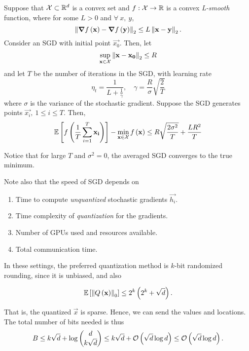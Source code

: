 \documentclass[twoside]{article}
\begin{document}
\begin{theorem}
    \label{thm:avg-sgd}
    Suppose that \(\mathcal X\subset\mathbb R^d\) is a convex set and \(f:\mathcal X\rightarrow\mathbb R\)
    is a convex \emph{L-smooth} function, where for some \(L > 0\) and
    \(\forall\ x,\ y\),
    \begin{equation}
        \left\lVert\boldsymbol{\mathbf{\nabla}}f\left(\boldsymbol{\mathbf{x}}\right)-\boldsymbol{\mathbf{\nabla}}f\left(\boldsymbol{\mathbf{y}}\right)\right\rVert_2 \le L\left\lVert\boldsymbol{\mathbf{x}}-\boldsymbol{\mathbf{y}}\right\rVert_2.
        \label{eq:L-smooth}
    \end{equation}
    Consider an SGD with initial point \(\vec{x_0}\). Then, let
    \begin{equation}
        \sup_{\boldsymbol{\mathbf{x}}\in\mathcal X}\left\lVert\boldsymbol{\mathbf{x}}-\boldsymbol{\mathbf{x_0}}\right\rVert_2 \le R
    \end{equation}
    and let \(T\) be the number of iterations in the SGD, with learning rate
    \begin{equation}
        \eta_t = \frac{1}{L + \frac{1}{\gamma}},\quad \gamma = \frac{R}{\sigma}\sqrt{\frac{2}{T}}
    \end{equation}
    where \(\sigma\) is the variance of the stochastic gradient. Suppose the 
    SGD generates points \(\vec{x_i},\ 1 \le i \le T\). Then,
    \begin{equation}
        \mathbb{E}\left[ f\left(\frac{1}{T}\sum_{i=1}^T\boldsymbol{\mathbf{x_i}}\right) \right] - \min_{\boldsymbol{\mathbf{x}}\in\mathcal X}f\left(\boldsymbol{\mathbf{x}}\right) \le R\sqrt{\frac{2\sigma^2}{T}} + \frac{LR^2}{T}
    \end{equation}
\end{theorem}

Notice that for large \(T\) and \(\sigma^2 = 0\), the averaged SGD converges 
to the true minimum.

Note also that the speed of SGD depends on

\begin{enumerate}
    \item Time to compute \emph{unquantized} stochastic gradients \(\vec{h_i}\).
    \item Time complexity of \emph{quantization} for the gradients.
    \item Number of GPUs used and resources available.
    \item Total communication time.
\end{enumerate}

In these settings, the preferred quantization method is \(k\)-bit randomized
rounding, since it is unbiased, and also

\begin{equation}
    \mathbb{E}\left[ \left\lVert Q\left(\boldsymbol{\mathbf{x}}\right)\right\rVert_0 \right] \le 2^k\left(2^k + \sqrt{d}\right).
    \label{eq:rr-L0-bound}
\end{equation}

That is, the quantized \(\vec{x}\) is sparse. Hence, we can send the values and 
locations. The total number of bits needed is thus
\begin{equation}
    B \le k\sqrt{d} + \log\binom{d}{k\sqrt{d}} \le k\sqrt{d}+ \mathcal O\left(\sqrt{d}\log d\right) \le \mathcal O\left(\sqrt{d}\log d\right).
    \label{eq:num-bits-sparse}
\end{equation}
\end{document}
